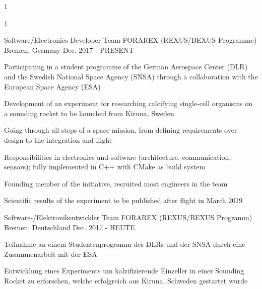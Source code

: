 \multilang
  {1}
  {}
  {}


\begin{cventries}

\multilang
  {1}
  {\cventry
    {Software/Electronics Developer} %
    {Team FORAREX (REXUS/BEXUS Programme)} %
    {Bremen, Germany} %
    {Dec. 2017 - PRESENT} %
    {
      \begin{cvitems} %
        \item {Participating in a student programme of the German Aerospace Center (DLR) and the Swedish National Space Agency (SNSA) through a collaboration with the European Space Agency (ESA)}
        \item {Development of an experiment for researching calcifying single-cell organisms on a sounding rocket to be launched from Kiruna, Sweden}
        \item {Going through all steps of a space mission, from defining requirements over design to the integration and flight}
        \item {Responsibilities in electronics and software (architecture, communication, sensors); fully implemented in C++ with CMake as build system}
        \item {Founding member of the initiative, recruited most engineers in the team}
        \item {Scientific results of the experiment to be published after flight in March 2019}
      \end{cvitems}
    }
  }{\cventry
    {Software-/Elektronikentwickler} %
    {Team FORAREX (REXUS/BEXUS Programm)} %
    {Bremen, Deutschland} %
    {Dec. 2017 - HEUTE} %
    {
      \begin{cvitems} %
        \item {Teilnahme an einem Studentenprogramm des DLRs und der SNSA durch eine Zusammenarbeit mit der ESA}
        \item {Entwicklung eines Experiments um kalzifizierende Einzeller in einer Sounding Rocket zu erforschen, welche erfolgreich aus Kiruna, Schweden gestartet wurde}

\end{cvitems}}}
\end{cventries}
